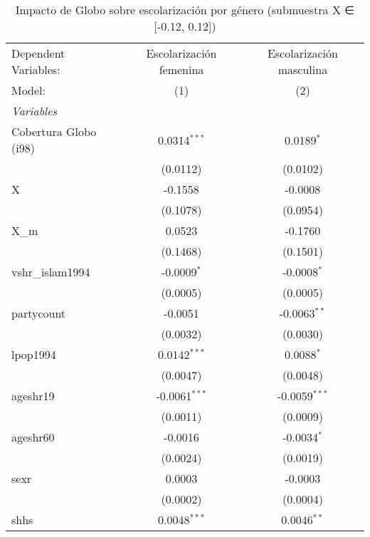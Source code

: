 \begin{table}[htbp]
   \caption{Impacto de Globo sobre escolarización por género (submuestra X ∈ [-0.12, 0.12])}
   \centering
   \begin{tabular}{lcc}
      \tabularnewline \midrule \midrule
      Dependent Variables:  & Escolarización femenina & Escolarización masculina\\  
      Model:                & (1)                     & (2)\\  
      \midrule
      \emph{Variables}\\
      Cobertura Globo (i98) & 0.0314$^{***}$          & 0.0189$^{*}$\\   
                            & (0.0112)                & (0.0102)\\   
      X                     & -0.1558                 & -0.0008\\   
                            & (0.1078)                & (0.0954)\\   
      X\_m                  & 0.0523                  & -0.1760\\   
                            & (0.1468)                & (0.1501)\\   
      vshr\_islam1994       & -0.0009$^{*}$           & -0.0008$^{*}$\\   
                            & (0.0005)                & (0.0005)\\   
      partycount            & -0.0051                 & -0.0063$^{**}$\\   
                            & (0.0032)                & (0.0030)\\   
      lpop1994              & 0.0142$^{***}$          & 0.0088$^{*}$\\   
                            & (0.0047)                & (0.0048)\\   
      ageshr19              & -0.0061$^{***}$         & -0.0059$^{***}$\\   
                            & (0.0011)                & (0.0009)\\   
      ageshr60              & -0.0016                 & -0.0034$^{*}$\\   
                            & (0.0024)                & (0.0019)\\   
      sexr                  & 0.0003                  & -0.0003\\   
                            & (0.0002)                & (0.0004)\\   
      shhs                  & 0.0048$^{***}$          & 0.0046$^{**}$\\   

\end{tabular}
\end{table}
